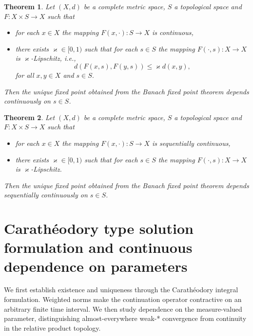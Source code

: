 \documentclass[reqno]{amsart}
\theoremstyle{plain}
\newtheorem{theorem}{Theorem}[section]
\numberwithin{equation}{section}
\numberwithin{definition}{section}
\begin{document}
\begin{theorem}
\label{thm:continuous_dependence_fixed_point}
    Let $(X,d)$ be a complete metric space, $S$ a topological space and $F \colon X \times S\to X$ such that 
 \begin{itemize}
     \item for each $x\in X$ the mapping  $F(x,\cdot ) \colon S \to X$ is continuous, 
     \item there exists $\varkappa\in [0,1)$  such that  for each $s\in S$ the mapping $F(\cdot, s) \colon X \to X$  is $\varkappa$\nobreakdash-\hspace{0pt}Lipschitz, i.e., 
     \begin{equation*}
        d(F(x,s), F(y,s))\le \varkappa d(x, y),
    \end{equation*}
    for all $x,y\in X$ and $s\in S.$
 \end{itemize}   
 Then the unique fixed point obtained from the Banach fixed point theorem depends continuously on $s\in S$. 
\end{theorem}

\begin{theorem}
\label{thm:seq_continuous_dependence_fixed_point}
    Let $(X,d)$ be a complete metric space, $S$ a topological space and $F \colon X \times S \to X$ such that 
 \begin{itemize}
     \item for each $x\in X$ the mapping  $F(x,\cdot ) \colon S\to X$ is sequentially continuous, 
     \item there exists $\varkappa\in [0,1)$  such that  for each $s\in S$ the mapping $F(\cdot, s) \colon X \to X$ is $\varkappa$\nobreakdash-\hspace{0pt}Lipschitz. 
 \end{itemize}   
 Then the unique fixed point obtained from the Banach fixed point theorem depends sequentially continuously on $s\in S$. 
\end{theorem}


\section{Carath\'{e}odory type solution formulation and continuous dependence on parameters}\label{sec:Carath-sol}

We first establish existence and uniqueness through
the Carath\'eodory integral formulation.
Weighted norms make the continuation operator contractive
on an arbitrary finite time interval.
We then study dependence on the measure-valued parameter,
distinguishing almost-everywhere weak-* convergence
from continuity in the relative product topology.
\end{document}
